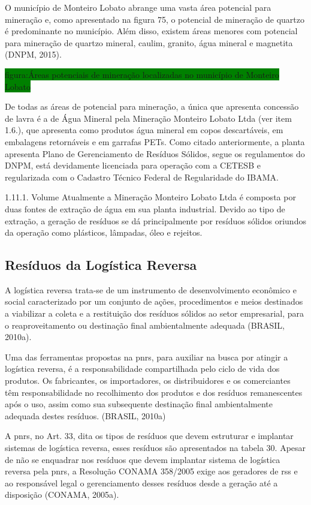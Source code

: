 	O município de Monteiro Lobato abrange uma vasta área potencial para mineração e, como apresentado na figura 75, o potencial de mineração de quartzo é predominante no município. Além disso, existem áreas menores com potencial para mineração de quartzo mineral, caulim, granito, água mineral e magnetita (DNPM, 2015).
	
	\colorbox{green}{figura:Áreas potenciais de mineração localizadas no município de Monteiro Lobato}

	De todas as áreas de potencial para mineração, a única que apresenta concessão de lavra é a de Água Mineral pela Mineração Monteiro Lobato Ltda (ver item 1.6.), que apresenta como produtos água mineral em copos descartáveis, em embalagens retornáveis e em garrafas PETs. Como citado anteriormente, a planta apresenta Plano de Gerenciamento de Resíduos Sólidos, segue os regulamentos do DNPM, está devidamente licenciada para operação com a CETESB e regularizada com o Cadastro Técnico Federal de Regularidade do IBAMA.
	
	1.11.1. Volume
	Atualmente a Mineração Monteiro Lobato Ltda é composta por duas fontes de extração de água em sua planta industrial. Devido ao tipo de extração, a geração de resíduos se dá principalmente por resíduos sólidos oriundos da operação como plásticos, lâmpadas, óleo e rejeitos.
	
	
	\subsection{Resíduos da Logística Reversa}
	A logística reversa trata-se de um instrumento de desenvolvimento econômico e social caracterizado por um conjunto de ações, procedimentos e meios destinados a viabilizar a coleta e a restituição dos resíduos sólidos ao setor empresarial, para o reaproveitamento ou destinação final ambientalmente adequada (BRASIL, 2010a). 
	
	Uma das ferramentas propostas na \gls{pnrs}, para auxiliar na busca por atingir a logística reversa, é a responsabilidade compartilhada pelo ciclo de vida dos produtos. Os fabricantes, os importadores, os distribuidores e os comerciantes têm responsabilidade no recolhimento dos produtos e dos resíduos remanescentes após o uso, assim como sua subsequente destinação final ambientalmente adequada destes resíduos. (BRASIL, 2010a)
	
	A \gls{pnrs}, no Art. 33, dita os tipos de resíduos que devem estruturar e implantar sistemas de logística reversa, esses resíduos são apresentados na tabela 30. Apesar de não se enquadrar nos resíduos que devem implantar sistema de logística reversa pela \gls{pnrs}, a Resolução CONAMA 358/2005 exige aos geradores de \gls{rss} e ao responsável legal o gerenciamento desses resíduos desde a geração até a disposição (CONAMA, 2005a).
	
